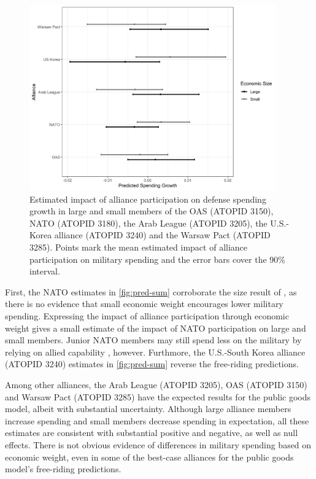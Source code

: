 \documentclass[12pt]{article}
\begin{document}
\begin{figure}[htbp]
	\centering
		\includegraphics[width=0.95\textwidth]{pred-sum.png}
	\caption{Estimated impact of alliance participation on defense spending growth in large and small members of the OAS (ATOPID 3150), NATO (ATOPID 3180), the Arab League (ATOPID 3205), the U.S.-Korea alliance (ATOPID 3240) and the Warsaw Pact (ATOPID 3285). Points mark the mean estimated impact of alliance participation on military spending and the error bars cover the 90\% interval.}
	\label{fig:pred-sum}
\end{figure}


First, the NATO estimates in \autoref{fig:pred-sum} corroborate the size result of \citet{PluemperNeumayer2015}, as there is no evidence that small economic weight encourages lower military spending.
Expressing the impact of alliance participation through economic weight gives a small estimate of the impact of NATO participation on large and small members.  
Junior NATO members may still spend less on the military by relying on allied capability \citep{GeorgeSandler2017}, however. 
Furthmore, the U.S.-South Korea alliance (ATOPID 3240) estimates in \autoref{fig:pred-sum} reverse the free-riding predictions. 


Among other alliances, the Arab League (ATOPID 3205), OAS (ATOPID 3150) and Warsaw Pact (ATOPID 3285) have the expected results for the public goods model, albeit with substantial uncertainty.
Although large alliance members increase spending and small members decrease spending in expectation, all these estimates are consistent with substantial positive and negative, as well as null effects. 
There is not obvious evidence of differences in military spending based on economic weight, even in some of the best-case alliances for the public goods model's free-riding predictions. 
\end{document}
